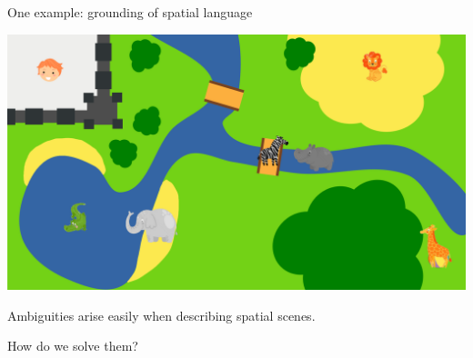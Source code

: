 \documentclass[compress]{beamer}
\begin{document}
\begin{frame}{One example: grounding of spatial language}


    \begin{center}
        \includegraphics[width=0.9\linewidth]{ambiguous-desc/RefMap}

    Ambiguities arise easily when describing spatial scenes.

    How do we solve them?

    \end{center}

\end{frame}




\end{document}
